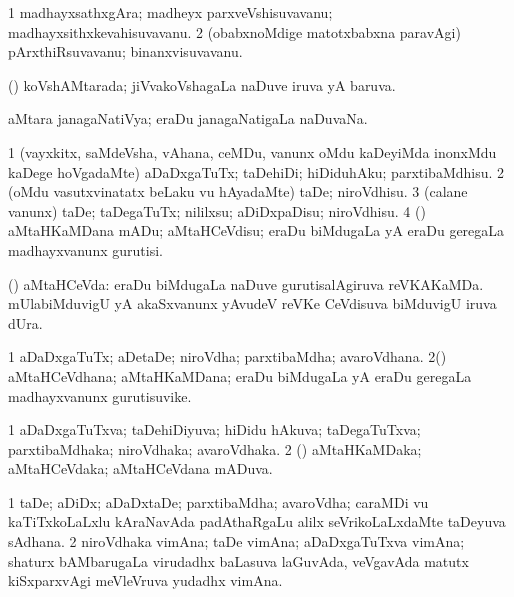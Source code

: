 \bentry
{}
\gl{\nA}
\bmng
\bnum
\num{1} madhayxsathxgAra; madheyx parxveVshisuvavanu; madhayxsithxkevahisuvavanu. 
\num{2} (obabxnoMdige matotxbabxna paravAgi) pArxthiRsuvavanu; binanxvisuvavanu. 
\enum
\emng
\eentry

\bentry
{}
\gl{\gu}
\bmng
(\jiVvi) koVshAMtarada; jiVvakoVshagaLa naDuve iruva yA baruva. 
\emng
\eentry

\bentry
{}
\gl{\gu}
\bmng
aMtara janagaNatiVya; eraDu janagaNatigaLa naDuvaNa. 
\emng
\eentry

\bentry
{}
\gl{\sakirx}
\bmng
\bnum
\num{1} (vayxkitx, saMdeVsha, vAhana, ceMDu, \mo vanunx oMdu kaDeyiMda inonxMdu kaDege hoVgadaMte) aDaDxgaTuTx; taDehiDi; hiDiduhAku; parxtibaMdhisu. 
\num{2} (oMdu vasutxvinatatx beLaku \mo vu hAyadaMte) taDe; niroVdhisu. 
\num{3} (calane \mo vanunx) taDe; taDegaTuTx; nililxsu; aDiDxpaDisu; niroVdhisu. 
\num{4} (\ga) aMtaHKaMDana mADu; aMtaHCeVdisu; eraDu biMdugaLa yA eraDu geregaLa madhayxvanunx gurutisi. 
\enum
\emng
\eentry
 
\bentry
{}
\gl{\nA}
\bmng
(\ga) aMtaHCeVda: 
\banum
{} eraDu biMdugaLa naDuve gurutisalAgiruva reVKAKaMDa. 
 mUlabiMduvigU  yA  akaSxvanunx yAvudeV reVKe CeVdisuva biMduvigU iruva dUra. 
\eanum
\emng
\eentry

\bentry
{}
\gl{\nA}
\bmng
\bnum
\num{1} aDaDxgaTuTx; aDetaDe; niroVdha; parxtibaMdha; avaroVdhana. 
\num{2}(\ga) aMtaHCeVdhana; aMtaHKaMDana; eraDu biMdugaLa yA eraDu geregaLa madhayxvanunx gurutisuvike. 
\enum
\emng
\eentry

\bentry
{}
\gl{\gu}
\bmng
\bnum
\num{1} aDaDxgaTuTxva; taDehiDiyuva; hiDidu hAkuva; taDegaTuTxva; parxtibaMdhaka; niroVdhaka; avaroVdhaka. 
\num{2} (\ga) aMtaHKaMDaka; aMtaHCeVdaka; aMtaHCeVdana mADuva. 
\enum
\emng
\eentry

\bentry
{}
\gl{\nA}
\bmng
\bnum
\num{1} taDe; aDiDx; aDaDxtaDe; parxtibaMdha; avaroVdha; caraMDi \mo vu kaTiTxkoLaLxlu kAraNavAda padAthaRgaLu alilx seVrikoLaLxdaMte taDeyuva sAdhana. 
\num{2} niroVdhaka vimAna; taDe vimAna; aDaDxgaTuTxva vimAna; shaturx bAMbarugaLa virudadhx baLasuva laGuvAda, veVgavAda matutx kiSxparxvAgi meVleVruva yudadhx vimAna. 
\enum
\emng
\eentry


